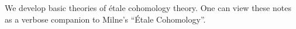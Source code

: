 \Preface

We develop basic theories of \'etale cohomology theory. One can
view these notes as a verbose companion to Milne's ``\'Etale
Cohomology''.
